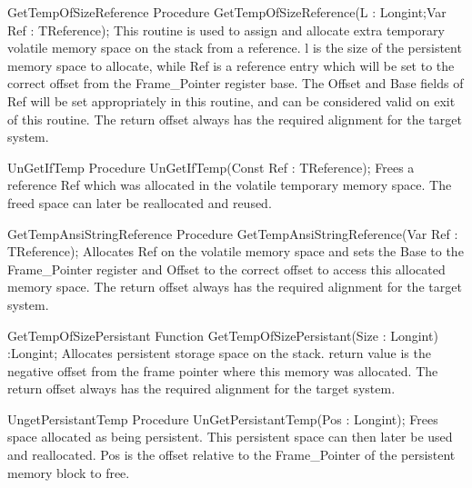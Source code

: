 \documentclass [a4paper,12pt]{article}
\begin{document}
\begin{procedure}{GetTempOfSizeReference}
\Declaration
Procedure GetTempOfSizeReference(L : Longint;Var Ref : TReference);
\Description
This routine is used to assign and allocate extra temporary volatile memory
space on the stack from a reference. \textsf{l} is the size of the
persistent memory space to allocate, while \textsf{Ref} is a reference entry
which will be set to the correct offset from the Frame{\_}Pointer register
base. The \textsf{Offset} and \textsf{Base} fields of \textsf{Ref} will be
set appropriately in this routine, and can be considered valid on exit of
this routine.
\Notes
The return offset always has the required alignment for the target system.
\end{procedure}

\begin{procedure}{UnGetIfTemp}
\Declaration
Procedure UnGetIfTemp(Const Ref : TReference);
\Description
Frees a reference \textsf{Ref} which was allocated in the volatile temporary
memory space. 
\Notes
The freed space can later be reallocated and reused.
\end{procedure}

\begin{procedure}{GetTempAnsiStringReference}
\Declaration
Procedure GetTempAnsiStringReference(Var Ref : TReference);
\Description
Allocates \textsf{Ref} on the volatile memory space and sets the
\textsf{Base} to the Frame{\_}Pointer register and \textsf{Offset} to the
correct offset to access this allocated memory space.
\Notes
The return offset always has the required alignment for the target system.
\end{procedure}

\begin{function}{GetTempOfSizePersistant}
\Declaration
Function GetTempOfSizePersistant(Size : Longint) :Longint;
\Description
Allocates persistent storage space on the stack. return value is the
negative offset from the frame pointer where this memory was allocated.
\Notes
The return offset always has the required alignment for the target system.
\end{function}

\begin{function}{UngetPersistantTemp}
\Declaration
Procedure UnGetPersistantTemp(Pos : Longint);
\Description
Frees space allocated as being persistent. This persistent space can then
later be used and reallocated. \textsf{Pos} is the offset relative to the
Frame{\_}Pointer of the persistent memory block to free.
\end{function}
\end{document}
